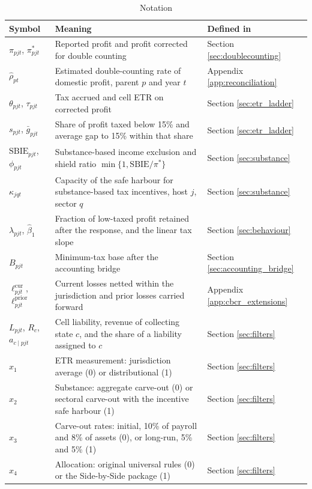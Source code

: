 \documentclass[11pt,a4paper]{article}
\begin{document}
\begin{table}[H]
\centering
\footnotesize
\caption{Notation}\label{tab:app_notation}
\begin{tabularx}{\textwidth}{@{}lXl@{}}
\toprule
Symbol & Meaning & Defined in \\
\midrule
$\pi_{pjt}$, $\pi^{*}_{pjt}$ & Reported profit and profit corrected for double counting & Section \ref{sec:doublecounting} \\
$\hat\rho_{pt}$ & Estimated double-counting rate of domestic profit, parent $p$ and year $t$ & Appendix \ref{app:reconciliation} \\
$\theta_{pjt}$, $\tau_{pjt}$ & Tax accrued and cell ETR on corrected profit & Section \ref{sec:etr_ladder} \\
$s_{pjt}$, $\bar g_{pjt}$ & Share of profit taxed below 15\% and average gap to 15\% within that share & Section \ref{sec:etr_ladder} \\
$\mathrm{SBIE}_{pjt}$, $\phi_{pjt}$ & Substance-based income exclusion and shield ratio $\min\{1,\mathrm{SBIE}/\pi^{*}\}$ & Section \ref{sec:substance} \\
$\kappa_{jqt}$ & Capacity of the safe harbour for substance-based tax incentives, host $j$, sector $q$ & Section \ref{sec:substance} \\
$\lambda_{pjt}$, $\hat\beta_1$ & Fraction of low-taxed profit retained after the response, and the linear tax slope & Section \ref{sec:behaviour} \\
$B_{pjt}$ & Minimum-tax base after the accounting bridge & Section \ref{sec:accounting_bridge} \\
$\ell^{\mathrm{cur}}_{pjt}$, $\ell^{\mathrm{prior}}_{pjt}$ & Current losses netted within the jurisdiction and prior losses carried forward & Appendix \ref{app:cbcr_extensions} \\
$L_{pjt}$, $R_c$, $a_{c\mid pjt}$ & Cell liability, revenue of collecting state $c$, and the share of a liability assigned to $c$ & Section \ref{sec:filters} \\
$x_1$ & ETR measurement: jurisdiction average (0) or distributional (1) & Section \ref{sec:filters} \\
$x_2$ & Substance: aggregate carve-out (0) or sectoral carve-out with the incentive safe harbour (1) & Section \ref{sec:filters} \\
$x_3$ & Carve-out rates: initial, 10\% of payroll and 8\% of assets (0), or long-run, 5\% and 5\% (1) & Section \ref{sec:filters} \\
$x_4$ & Allocation: original universal rules (0) or the Side-by-Side package (1) & Section \ref{sec:filters} \\

\end{tabularx}
\end{table}
\end{document}
